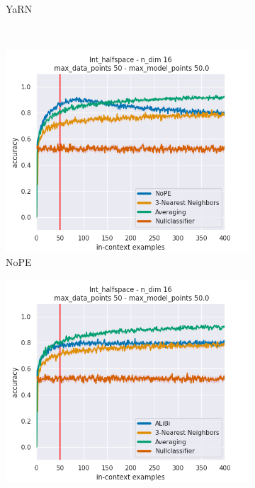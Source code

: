 \documentclass[letterpaper]{article} %
\begin{document}
\begin{figure}[tp]
\begin{subfigure}[t]{0.24\linewidth}
        \caption{YaRN}
    \end{subfigure}
    \\
    \begin{subfigure}[t]{0.24\linewidth}
        \includegraphics[width=\linewidth]{AnonymousSubmission/LaTeX/imgs/experiments/halfspace/nope.png}
        \caption{NoPE}
    \end{subfigure}
    \begin{subfigure}[t]{0.24\linewidth}
        \includegraphics[width=\linewidth]{AnonymousSubmission/LaTeX/imgs/experiments/halfspace/alibi.png}

\end{subfigure}
\end{figure}
\end{document}

